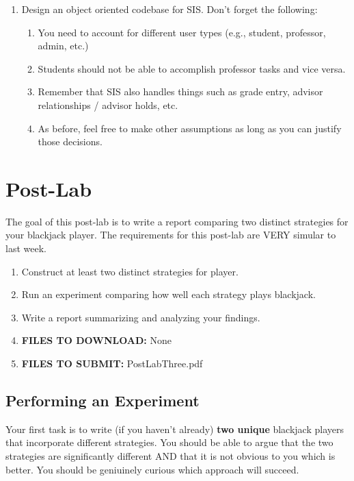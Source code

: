 \documentclass[paper=a4, fontsize=11pt, parskip=full]{scrartcl} %
\numberwithin{equation}{section} %
\numberwithin{figure}{section} %
\numberwithin{table}{section} %
\begin{document}
\begin{enumerate}
	\item Design an object oriented codebase for SIS. Don't forget the following:
	\begin{enumerate}
		\item You need to account for different user types (e.g., student, professor, admin, etc.)
		\item Students should not be able to accomplish professor tasks and vice versa.
		\item Remember that SIS also handles things such as grade entry, advisor relationships / advisor holds, etc.
		\item As before, feel free to make other assumptions as long as you can justify those decisions.
	\end{enumerate}
\end{enumerate}




\newpage
\section{Post-Lab}

The goal of this post-lab is to write a report comparing two distinct strategies for your blackjack player. The requirements for this post-lab are VERY simular to last week. 

\begin{enumerate}
	\item Construct at least two distinct strategies for player. 
	\item Run an experiment comparing how well each strategy plays blackjack.
	\item Write a report summarizing and analyzing your findings.
	\item \textbf{FILES TO DOWNLOAD:} None
	\item \textbf{FILES TO SUBMIT:} PostLabThree.pdf
\end{enumerate}

\subsection{Performing an Experiment}

Your first task is to write (if you haven't already) \textbf{two unique} blackjack players that incorporate different strategies. You should be able to argue that the two strategies are significantly different AND that it is not obvious to you which is better. You should be geniuinely curious which approach will succeed.
\end{document}

